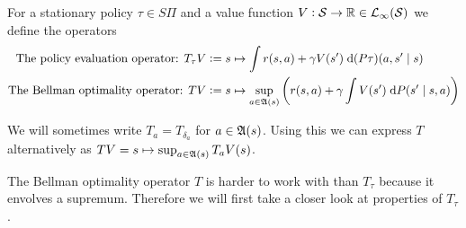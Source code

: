 \begin{defn}
  For a stationary policy $\tau \in S\Pi$ and a value function
  $V:\mathcal{S} \to \mathbb{R} \in \mathcal{L}_\infty(\mathcal{S})$
  we define the operators 
  \begin{align*}
    \text{The policy evaluation operator: }
    T_\tau V & \vcentcolon= s \mapsto \int r(s, a)
    + \gamma V(s') \; \mathrm{d} (P \tau)(a, s'\mid s)
    \\ \text{The Bellman optimality operator: }
    T V & \vcentcolon= s \mapsto 
    \sup_{a \in \frak{A}(s)} \left(r(s, a) + \gamma \int V(s')
    \; \mathrm{d} P(s' \mid s, a) \right)
  \end{align*}
\end{defn}
\begin{rem}
  We will sometimes write $T_a = T_{\delta_a}$ for $a \in \frak{A}(s)$.
  Using this we can express $T$ alternatively as
  $TV = s \mapsto \sup_{a \in \frak{A}(s)} T_a V(s)$.
\end{rem}

The Bellman optimality operator $T$
is harder to work with than $T_\tau$ because it envolves a supremum.
Therefore we will first take a closer look at properties of $T_\tau$.


